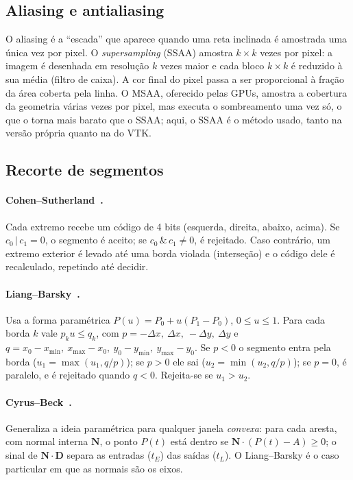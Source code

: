 \documentclass[11pt, a4paper]{article}
\begin{document}
\subsection{Aliasing e antialiasing}
O aliasing é a ``escada'' que aparece quando uma reta inclinada é amostrada uma única
vez por pixel. O \emph{supersampling} (SSAA) amostra $k\times k$ vezes por pixel: a
imagem é desenhada em resolução $k$ vezes maior e cada bloco $k\times k$ é reduzido
à sua média (filtro de caixa). A cor final do pixel passa a ser proporcional à fração
da área coberta pela linha. O MSAA, oferecido pelas GPUs, amostra a cobertura da
geometria várias vezes por pixel, mas executa o sombreamento uma vez só, o que o
torna mais barato que o SSAA; aqui, o SSAA é o método usado, tanto na versão própria
quanto na do VTK.

\subsection{Recorte de segmentos}
\paragraph{Cohen--Sutherland~\cite{foley1990}.} Cada extremo recebe um código de 4 bits (esquerda,
direita, abaixo, acima). Se $c_0\,|\,c_1=0$, o segmento é aceito; se $c_0\,\&\,c_1\neq0$,
é rejeitado. Caso contrário, um extremo exterior é levado até uma borda violada
(interseção) e o código dele é recalculado, repetindo até decidir.

\paragraph{Liang--Barsky~\cite{liang1984}.} Usa a forma paramétrica $P(u)=P_0+u(P_1-P_0)$,
$0\le u\le1$. Para cada borda $k$ vale $p_k u\le q_k$, com $p=-\Delta x,\ \Delta x,\ -\Delta y,\ \Delta y$
e $q=x_0-x_{\min},\ x_{\max}-x_0,\ y_0-y_{\min},\ y_{\max}-y_0$. Se $p<0$ o segmento entra
pela borda ($u_1=\max(u_1,q/p)$); se $p>0$ ele sai ($u_2=\min(u_2,q/p)$); se $p=0$, é
paralelo, e é rejeitado quando $q<0$. Rejeita-se se $u_1>u_2$.

\paragraph{Cyrus--Beck~\cite{cyrus1978}.} Generaliza a ideia paramétrica para qualquer janela
\emph{convexa}: para cada aresta, com normal interna $\mathbf{N}$, o ponto $P(t)$ está dentro
se $\mathbf{N}\cdot(P(t)-A)\ge0$; o sinal de $\mathbf{N}\cdot\mathbf{D}$ separa as entradas
($t_E$) das saídas ($t_L$). O Liang--Barsky é o caso particular em que as normais são os eixos.
\end{document}
